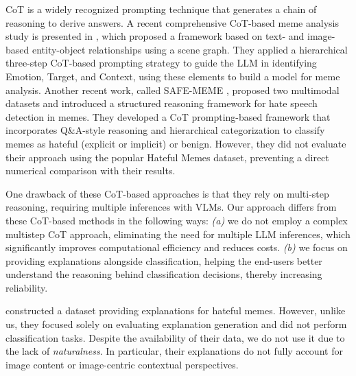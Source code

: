 %
CoT is a widely recognized prompting technique that generates a chain of reasoning to derive answers. 
%
A recent comprehensive CoT-based meme analysis study is presented in \cite{kumari2024m3hop}, which proposed a framework based on text- and image-based entity-object relationships using a scene graph. They applied a hierarchical three-step CoT-based prompting strategy to guide the LLM in identifying Emotion, Target, and Context, using these elements to build a model for meme analysis.  
%
Another recent work, called SAFE-MEME \cite{nandi2024safe}, proposed two multimodal datasets and introduced a structured reasoning framework for hate speech detection in memes. They developed a CoT prompting-based framework that incorporates Q\&A-style reasoning and hierarchical categorization to classify memes as hateful (explicit or implicit) or benign. However, they did not evaluate their approach using the popular Hateful Memes dataset, preventing a direct numerical comparison with their results.  

One drawback of these CoT-based approaches is that they rely on multi-step reasoning, requiring multiple inferences with VLMs. Our approach differs from these CoT-based methods in the following ways:  \textit{(a)} we do not employ a complex multistep CoT approach, eliminating the need for multiple LLM inferences, which significantly improves computational efficiency and reduces costs.  \textit{(b)} we focus on providing explanations alongside classification, helping the end-users better understand the reasoning behind classification decisions, thereby increasing reliability.
%

\cite{hee2023decoding} constructed a dataset providing explanations for hateful memes. However, unlike us, they focused solely on evaluating explanation generation and did not perform classification tasks. 
Despite the availability of their data, we do not use it due to the lack of \textit{naturalness}. In particular, their explanations do not fully account for image content or image-centric contextual perspectives.

%
